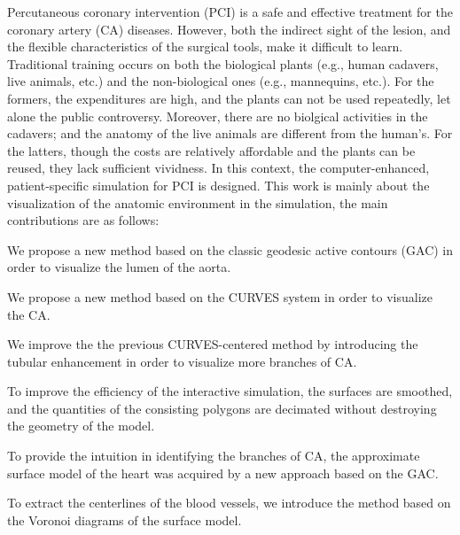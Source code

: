 
\begin{englishabstract}

Percutaneous coronary intervention (PCI) is a safe and effective treatment for the coronary artery (CA) diseases.
However, both the indirect sight of the lesion, and the flexible characteristics of the surgical tools, make it difficult to learn. 
Traditional training occurs on both the biological plants (e.g., human cadavers, live animals, etc.) and the non-biological ones (e.g., mannequins, etc.). 
For the formers, the expenditures are high, and the plants can not be used repeatedly, let alone the public controversy. 
Moreover, there are no biolgical activities in the cadavers; and the anatomy of the live animals are different from the human's.
For the latters, though the costs are relatively affordable and the plants can be reused, they lack sufficient vividness. 
In this context, the computer-enhanced, patient-specific simulation for PCI is designed. 
This work is mainly about the visualization of the anatomic environment in the simulation, the main contributions are as follows: 

We propose a new method based on the classic geodesic active contours (GAC) in order to visualize the lumen of the aorta. 

We propose a new method based on the CURVES system in order to visualize the CA. 

We improve the the previous CURVES-centered method by introducing the tubular enhancement in order to visualize more branches of CA.

To improve the efficiency of the interactive simulation, the surfaces are smoothed, and the quantities of the consisting polygons are decimated without destroying the geometry of the model.

To provide the intuition in identifying the branches of CA, the approximate surface model of the heart was acquired by a new approach based on the GAC. 

To extract the centerlines of the blood vessels, we introduce the method based on the Voronoi diagrams of the surface model. 

%
\end{englishabstract}
